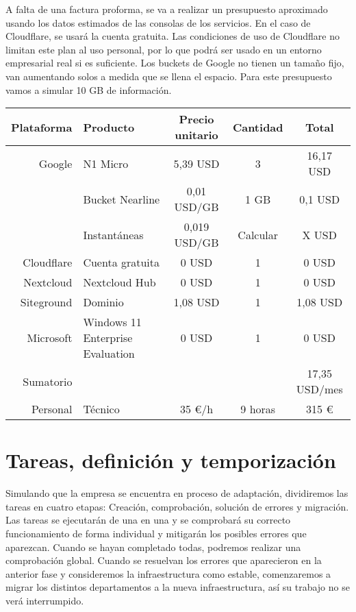 A falta de una factura proforma, se va a realizar un presupuesto aproximado usando los datos estimados de las consolas de los servicios. En el caso de Cloudflare, se usará la cuenta gratuita. Las condiciones de uso de Cloudflare no limitan este plan al uso personal, por lo que podrá ser usado en un entorno empresarial real si es suficiente\cite{CloudflareTerms}. Los buckets de Google no tienen un tamaño fijo, van aumentando solos a medida que se llena el espacio. Para este presupuesto vamos a simular 10 GB de información.

\begin{table}[h!]
\centering
\begin{tabularx}{\textwidth}{|r|X|c|c|c|}
\hline
Plataforma     & Producto       & Precio unitario & Cantidad & Total             \\ \hline
Google         & N1 Micro       & 5,39 USD        &    3     & 16,17 USD         \\
               & Bucket Nearline& 0,01 USD/GB     & 1\times10 GB  & 0,1 USD      \\
               & Instantáneas   & 0,019 USD/GB    & Calcular & X USD             \\ \hline
Cloudflare     & Cuenta gratuita& 0 USD           & 1        & 0 USD             \\ \hline
Nextcloud      & Nextcloud Hub  & 0 USD           & 1        & 0 USD             \\ \hline
Siteground     & Dominio        & 1,08 USD        & 1        & 1,08 USD          \\ \hline
Microsoft      & Windows 11 Enterprise Evaluation & 0 USD & 1 & 0 USD            \\ \hline
Sumatorio      &                &                 &          & 17,35 USD/mes     \\ \hline \hline
Personal       & Técnico        & 35 €/h           & 9 horas  & 315 €            \\ \hline
\end{tabularx}
\label{tab:presupuesto}
\end{table}

\section{Tareas, definición y temporización}
Simulando que la empresa se encuentra en proceso de adaptación, dividiremos las tareas en cuatro etapas: Creación, comprobación, solución de errores y migración. Las tareas se ejecutarán de una en una y se comprobará su correcto funcionamiento de forma individual y mitigarán los posibles errores que aparezcan. Cuando se hayan completado todas, podremos realizar una comprobación global. Cuando se resuelvan los errores que aparecieron en la anterior fase y consideremos la infraestructura como estable, comenzaremos a migrar los distintos departamentos a la nueva infraestructura, así su trabajo no se verá interrumpido.
